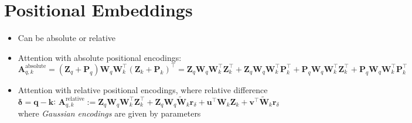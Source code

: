\section{Positional Embeddings}
\begin{itemize}
    \item Can be absolute or relative
    \item Attention with absolute positional encodings: $
    \boldsymbol{A}_{q,k}^{\text{absolute}} = \left( \boldsymbol{Z}_{q} + \boldsymbol{P}_{q} \right) \boldsymbol{W}_q \boldsymbol{W}_k^\intercal \left( \boldsymbol{Z}_{k} + \boldsymbol{P}_{k} \right)^\intercal
    = \boldsymbol{Z}_{q} \boldsymbol{W}_q \boldsymbol{W}_k^\intercal \boldsymbol{Z}_{k}^\intercal 
    + \boldsymbol{Z}_{q} \boldsymbol{W}_q \boldsymbol{W}_k^\intercal \boldsymbol{P}_{k}^\intercal 
    + \boldsymbol{P}_{q} \boldsymbol{W}_q \boldsymbol{W}_k^\intercal \boldsymbol{Z}_{k}^\intercal 
    + \boldsymbol{P}_{q} \boldsymbol{W}_q \boldsymbol{W}_k^\intercal \boldsymbol{P}_{k}^\intercal
    $
    \item Attention with relative positional encodings, where relative difference $\boldsymbol{\delta} = \boldsymbol{q}-\boldsymbol{k}$: 
    $
    \boldsymbol{A}_{q,k}^{\text{relative}} := \boldsymbol{Z}_{q} \boldsymbol{W}_q \boldsymbol{W}_k^\intercal \boldsymbol{Z}_{k}^\intercal 
    + \boldsymbol{Z}_{q} \boldsymbol{W}_q \widetilde{\boldsymbol{W}}_k \boldsymbol{r}_\delta 
    + \boldsymbol{u}^\intercal \boldsymbol{W}_k \boldsymbol{Z}_{k} 
    + \boldsymbol{v}^\intercal \widetilde{\boldsymbol{W}}_k \boldsymbol{r}_\delta
    $ where \emph{Gaussian encodings} are given by parameters
\end{itemize}

